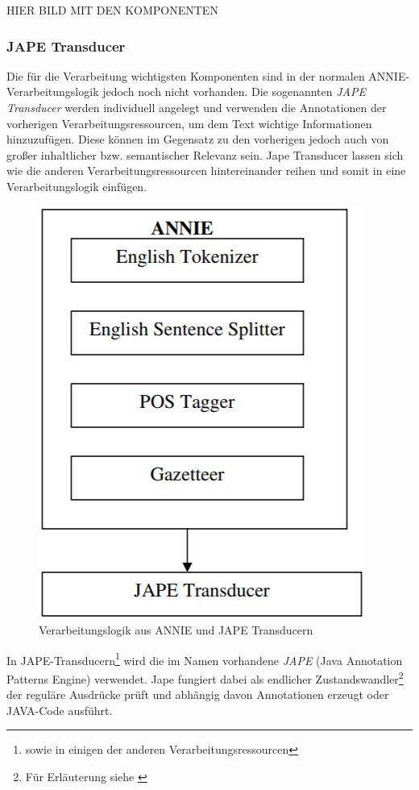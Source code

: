 \documentclass[12pt]{report}
\begin{document}
HIER BILD MIT DEN KOMPONENTEN\\

\subsubsection{JAPE Transducer}

Die für die Verarbeitung wichtigsten Komponenten sind in der normalen ANNIE-Verarbeitungslogik jedoch noch nicht vorhanden. Die sogenannten \textit{JAPE Transducer} werden individuell angelegt und verwenden die Annotationen der vorherigen Verarbeitungsressourcen, um dem Text wichtige Informationen hinzuzufügen. Diese können im Gegensatz zu den vorherigen jedoch auch von großer inhaltlicher bzw. semantischer Relevanz sein. Jape Transducer lassen sich wie die anderen Verarbeitungsressourcen hintereinander reihen und somit in eine Verarbeitungslogik einfügen.

\begin{figure}[H]
\begin{center}
\includegraphics[scale=0.7]{Bilder/ANNIE-Pipeline.jpg}
\caption{Verarbeitungslogik aus ANNIE und JAPE Transducern \cite{tol09}}
\end{center}
\end{figure}   

In JAPE-Transducern\footnote{sowie in einigen der anderen Verarbeitungsressourcen} wird die im Namen vorhandene \textit{JAPE} (Java Annotation Patterns Engine) verwendet. Jape fungiert dabei als endlicher Zustandswandler\footnote{Für Erläuterung siehe \cite{rs18}} der reguläre Ausdrücke prüft und abhängig davon 
Annotationen erzeugt oder JAVA-Code ausführt.
 
\end{document}
